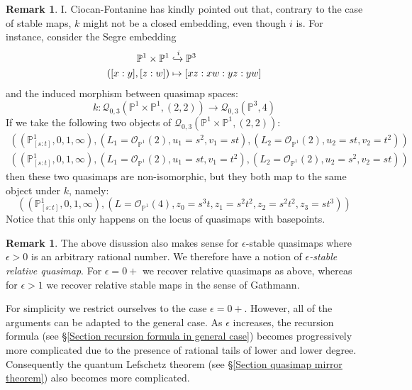 \documentclass[10pt]{amsart}
\newcommand{\Q}[4]{\mathcal{Q}_{#1,#2}(#3,#4)}
\newcommand{\PP}{\mathbb P}
\newcommand{\OO}{\mathcal{O}}
\renewcommand{\to}{\rightarrow}
\theoremstyle{definition}
\theoremstyle{definition}
\newtheorem{remark}[thm]{Remark}
\begin{document}
\begin{remark}\label{Example of non-injectivity}
I. Ciocan-Fontanine has kindly pointed out that, contrary to the case of stable maps, $k$ might not be a closed embedding, even though $i$ is. For instance, consider the Segre embedding
\begin{align*}
\PP^1\times\PP^1 & \xhookrightarrow{i} \PP^3\\ 
([x:y],[z:w]) & \mapsto [xz:xw:yz:yw]\end{align*}
and the induced morphism between quasimap spaces:
\begin{equation*} k\colon \Q{0}{3}{\PP^1\times\PP^1}{(2,2)}\to\Q{0}{3}{\PP^3}{4} \end{equation*}
If we take the following two objects of $\Q{0}{3}{\PP^1 \times \PP^1}{(2,2)}$:
\begin{align*}
  \left(\left(\PP^1_{[s:t]},0,1,\infty\right),\left(L_1=\OO_{\PP^1}(2),u_1=s^2 ,v_1=st\right),\left(L_2=\OO_{\PP^1}(2), u_2=st,v_2=t^2\right)\right)\\
  \left(\left(\PP^1_{[s:t]},0,1,\infty\right),\left(L_1=\OO_{\PP^1}(2),u_1=st ,v_1=t^2 \right),\left(L_2=\OO_{\PP^1}(2), u_2=s^2,v_2=st\right)\right)
\end{align*}
then these two quasimaps are non-isomorphic, but they both map to the same object under $k$, namely:
 \[
   \left(\left(\PP^1_{[s:t]},0,1,\infty\right),\left(L=\OO_{\PP^1}(4),z_0=s^3t,z_1=s^2t^2,z_2=s^2t^2,z_3=st^3\right)\right)
 \]
Notice that this only happens on the locus of quasimaps with basepoints.
\end{remark}

\begin{remark} The above disussion also makes sense for $\epsilon$-stable quasimaps where $\epsilon > 0$ is an arbitrary rational number. We therefore have a notion of \emph{$\epsilon$-stable relative quasimap}. For $\epsilon=0+$ we recover relative quasimaps as above, whereas for $\epsilon>1$ we recover relative stable maps in the sense of Gathmann.

For simplicity we restrict ourselves to the case $\epsilon=0+$. However, all of the arguments can be adapted to the general case. As $\epsilon$ increases, the recursion formula (see \S \ref{Section recursion formula in general case}) becomes progressively more complicated due to the presence of rational tails of lower and lower degree. Consequently the quantum Lefschetz theorem (see \S \ref{Section quasimap mirror theorem}) also becomes more complicated.
\end{remark}
\end{document}
